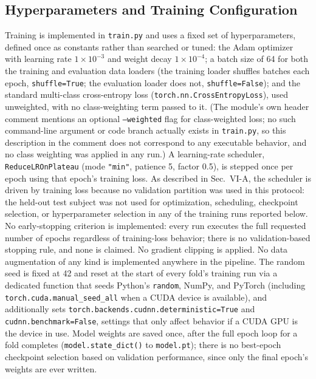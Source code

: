 \documentclass[conference]{IEEEtran}
\begin{document}
\subsection{Hyperparameters and Training Configuration}
\label{subsec:hyperparameters}

Training is implemented in \texttt{train.py} and uses a fixed set of
hyperparameters, defined once as constants rather than searched or
tuned: the Adam optimizer with learning rate $1\times10^{-3}$ and
weight decay $1\times10^{-4}$; a batch size of 64 for both the
training and evaluation data loaders (the training loader shuffles
batches each epoch, \texttt{shuffle=True}; the evaluation loader
does not, \texttt{shuffle=False}); and the standard multi-class
cross-entropy loss (\texttt{torch.nn.CrossEntropyLoss}), used
unweighted, with no class-weighting term passed to it. (The module's
own header comment mentions an optional \texttt{--weighted} flag for
class-weighted loss; no such command-line argument or code branch
actually exists in \texttt{train.py}, so this description in the
comment does not correspond to any executable behavior, and no class
weighting was applied in any run.) A learning-rate scheduler,
\texttt{ReduceLROnPlateau} (mode \texttt{"min"}, patience 5, factor
0.5), is stepped once per epoch using that epoch's training loss. As
described in Sec.~VI-A, the scheduler is driven by training loss
because no validation partition was used in this protocol: the
held-out test subject was not used for optimization, scheduling,
checkpoint selection, or hyperparameter selection in any of the
training runs reported below. No early-stopping criterion is
implemented: every run executes the full requested number of epochs
regardless of training-loss behavior; there is no validation-based
stopping rule, and none is claimed. No gradient clipping is applied.
No data augmentation of
any kind is implemented anywhere in the pipeline. The random seed is
fixed at 42 and reset at the start of every fold's training run via
a dedicated function that seeds Python's \texttt{random}, NumPy, and
PyTorch (including \texttt{torch.cuda.manual\_seed\_all} when a CUDA
device is available), and additionally sets
\texttt{torch.backends.cudnn.deterministic=True} and
\texttt{cudnn.benchmark=False}, settings that only affect behavior
if a CUDA GPU is the device in use. Model weights are saved once,
after the full epoch loop for a fold completes
(\texttt{model.state\_dict()} to \texttt{model.pt}); there
is no best-epoch checkpoint selection based on validation
performance, since only the final epoch's weights are ever written.
\end{document}
